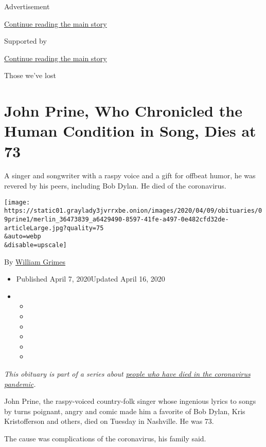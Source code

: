 Advertisement

\protect\hyperlink{after-top}{Continue reading the main story}

Supported by

\protect\hyperlink{after-sponsor}{Continue reading the main story}

Those we've lost

\hypertarget{john-prine-who-chronicled-the-human-condition-in-song-dies-at-73}{%
\section{John Prine, Who Chronicled the Human Condition in Song, Dies at
73}\label{john-prine-who-chronicled-the-human-condition-in-song-dies-at-73}}

A singer and songwriter with a raspy voice and a gift for offbeat humor,
he was revered by his peers, including Bob Dylan. He died of the
coronavirus.

\texttt{[image: https://static01.graylady3jvrrxbe.onion/images/2020/04/09/obituaries/09prine1/merlin\_36473839\_a6429490-8597-41fe-a497-0e482cfd32de-articleLarge.jpg?quality=75\\\&auto=webp\\\&disable=upscale]}

By \href{https://www.nytimes3xbfgragh.onion/by/william-grimes}{William
Grimes}

\begin{itemize}
\item
  Published April 7, 2020Updated April 16, 2020
\item
  \begin{itemize}
  \item
  \item
  \item
  \item
  \item
  \item
  \end{itemize}
\end{itemize}

\emph{This obituary is part of a series about}
\href{https://www.nytimes3xbfgragh.onion/series/people-who-have-died-of-the-coronavirus}{\emph{people
who have died in the coronavirus pandemic}}\emph{.}

John Prine, the raspy-voiced country-folk singer whose ingenious lyrics
to songs by turns poignant, angry and comic made him a favorite of Bob
Dylan, Kris Kristofferson and others, died on Tuesday in Nashville. He
was 73.

The cause was complications of the coronavirus, his family said.

